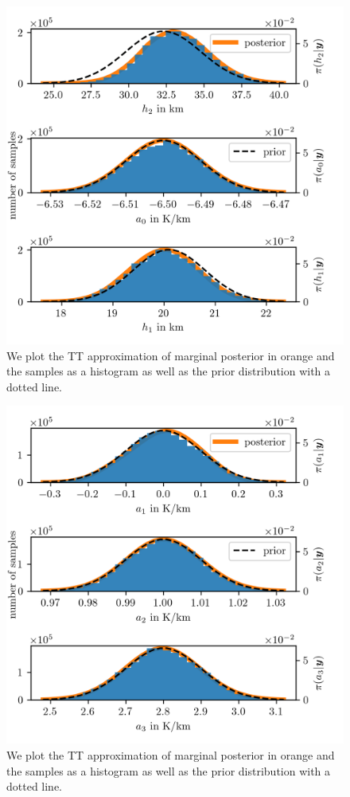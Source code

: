 \begin{figure}[ht!]
	\centering
	\includegraphics{PHdPTPost1.png}
	\caption[Histograms and TT approximation of posterior distribution as well as hyper-prior distribution.]{We plot the TT approximation of marginal posterior in orange and the samples as a histogram as well as the prior distribution with a dotted line.}
	\label{fig:PostHistTT1}
\end{figure}
\begin{figure}[ht!]
	\centering
	\includegraphics{PHdPTPost2.png}
	\caption[Histograms and TT approximation of posterior distribution as well as hyper-prior distribution.]{We plot the TT approximation of marginal posterior in orange and the samples as a histogram as well as the prior distribution with a dotted line.}
	\label{fig:PostHistTT2}
\end{figure}
